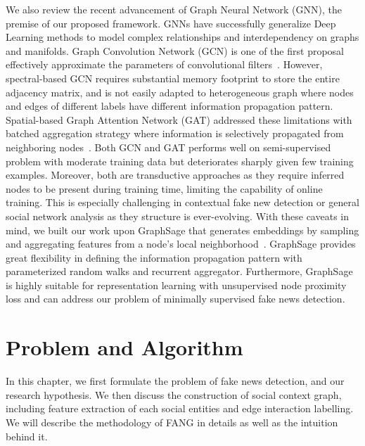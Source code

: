 \documentclass[fyp]{socreport}
\theoremstyle{definition}
\theoremstyle{hypothesis}
\begin{document}
We also review the recent advancement of Graph Neural Network (GNN), the premise of our proposed framework.
GNNs have successfully generalize Deep Learning methods to model complex relationships and interdependency on graphs and manifolds. Graph Convolution Network (GCN) is one of the first proposal effectively approximate the parameters of convolutional filters~\cite{kipf2016semi}. However, spectral-based GCN requires substantial memory footprint to store the entire adjacency matrix, and is not easily adapted to heterogeneous graph where nodes and edges of different labels have different information propagation pattern. Spatial-based Graph Attention Network (GAT) addressed these limitations with batched aggregation strategy where information is selectively propagated from neighboring nodes~\cite{velivckovic2017graph}. Both GCN and GAT performs well on semi-supervised problem with moderate training data but deteriorates sharply given few training examples. Moreover, both are transductive approaches as they require inferred nodes to be present during training time, limiting the capability of online training. This is especially challenging in contextual fake new detection or general social network analysis as they structure is ever-evolving. With these caveats in mind, we built our work upon GraphSage that generates embeddings by sampling and aggregating features
from a node’s local neighborhood~\cite{Hamilton2017InductiveRL}. GraphSage provides great flexibility in defining the information propagation pattern with parameterized random walks and recurrent aggregator. Furthermore, GraphSage is highly suitable for representation learning with unsupervised node proximity loss and can address our problem of minimally supervised fake news detection.



\chapter{Problem and Algorithm}
In this chapter, we first formulate the problem of fake news detection, and our research hypothesis. We then discuss the construction of social context graph, including feature extraction of each social entities and edge interaction labelling. We will describe the methodology of FANG in details as well as the intuition behind it.
\end{document}
